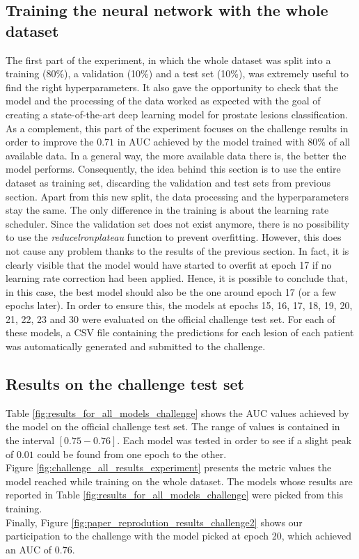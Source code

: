 \subsection{Training the neural network with the whole dataset}
\setlength{\marginparwidth}{3cm}\leavevmode {}The first part of the experiment, in which the whole dataset was split into a training (80\%), a validation (10\%) and a test set (10\%), was extremely useful to find the right hyperparameters. It also gave the opportunity to check that the model and the processing of the data worked as expected with the goal of creating a state-of-the-art deep learning model for prostate lesions classification.\\
As a complement, this part of the experiment focuses on the challenge results in order to improve the $0.71$ in AUC achieved by the model trained with 80\% of all available data. In a general way, the more available data there is, the better the model performs. Consequently, the idea behind this section is to use the entire dataset as training set, discarding the validation and test sets from previous section. Apart from this new split, the data processing and the hyperparameters stay the same. The only difference in the training is about the learning rate scheduler. Since the validation set does not exist anymore, there is no possibility to use the \textit{reducelronplateau} function to prevent overfitting. However, this does not cause any problem thanks to the results of the previous section. In fact, it is clearly visible that the model would have started to overfit at epoch 17 if no learning rate correction had been applied. Hence, it is possible to conclude that, in this case, the best model should also be the one around epoch 17 (or a few epochs later). In order to ensure this, the models at epochs 15, 16, 17, 18, 19, 20, 21, 22, 23 and 30 were evaluated on the official challenge test set. For each of these models, a CSV file containing the predictions for each lesion of each patient was automatically generated and submitted to the challenge.

\subsection{Results on the challenge test set}
\setlength{\marginparwidth}{3cm}\leavevmode {}Table \ref{fig:results_for_all_models_challenge} shows the AUC values achieved by the model on the official challenge test set. The range of values is contained in the interval $[0.75-0.76]$. Each model was tested in order to see if a slight peak of $0.01$ could be found from one epoch to the other.\\ 
Figure \ref{fig:challenge_all_results_experiment} presents the metric values the model reached while training on the whole dataset. The models whose results are reported in Table \ref{fig:results_for_all_models_challenge} were picked from this training.\\
Finally, Figure \ref{fig:paper_reprodution_results_challenge2} shows our participation to the challenge with the model picked at epoch 20, which achieved an AUC of $0.76$.


